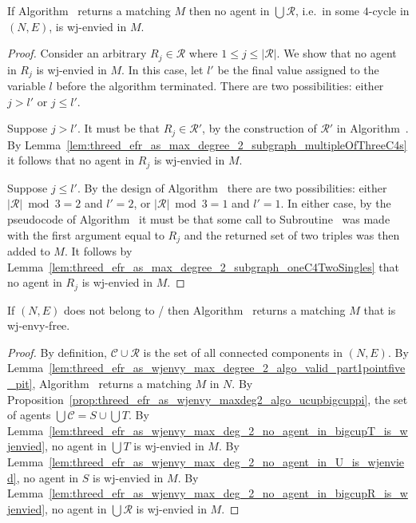 \begin{lem}
\label{lem:threed_efr_as_wjenvy_max_deg_2_no_agent_in_bigcupR_is_wjenvied}
If Algorithm~ returns a matching $M$ then no agent in $\bigcup \mathcal{R}$, i.e.\ in some $4$-cycle in $(N, E)$, is wj-envied in $M$.
\end{lem}
\begin{proof}
Consider an arbitrary $R_j \in \mathcal{R}$ where $1\leq j \leq |\mathcal{R}|$. We show that no agent in $R_j$ is wj-envied in $M$. In this case, let $l'$ be the final value assigned to the variable $l$ before the algorithm terminated. There are two possibilities: either $j>l'$ or $j\leq l'$.

Suppose $j>l'$. It must be that $R_j \in \mathcal{R}'$, by the construction of $\mathcal{R}'$ in Algorithm~. By Lemma~\ref{lem:threed_efr_as_max_degree_2_subgraph_multipleOfThreeC4s} it follows that no agent in $R_j$ is wj-envied in $M$.

Suppose $j\leq l'$. By the design of Algorithm~ there are two possibilities: either $|\mathcal{R}| \bmod 3 = 2$ and $l'=2$, or $|\mathcal{R}| \bmod 3 = 1$ and $l'=1$. In either case, by the pseudocode of Algorithm~ it must be that some call to Subroutine~ was made with the first argument equal to $R_j$ and the returned set of two triples was then added to $M$. It follows by Lemma~\ref{lem:threed_efr_as_max_degree_2_subgraph_oneC4TwoSingles} that no agent in $R_j$ is wj-envied in $M$.
\end{proof}

\begin{lem}
\label{lem:threed_efr_as_wjenvy_max_degree_2_algo_valid_part2_EF}
If $(N, E)$ does not belong to \iwjnomaxdegreetwofamily/ then Algorithm~ returns a matching $M$ that is wj-envy-free.
\end{lem}
\begin{proof}
By definition, $\mathcal{C} \cup \mathcal{R}$ is the set of all connected components in $(N, E)$. By Lemma~\ref{lem:threed_efr_as_wjenvy_max_degree_2_algo_valid_part1pointfive_pit}, Algorithm~ returns a matching $M$ in $N$. By Proposition~\ref{prop:threed_efr_as_wjenvy_maxdeg2_algo_ucupbigcuppi}, the set of agents $\bigcup \mathcal{C} = S \cup \bigcup T$. By Lemma~\ref{lem:threed_efr_as_wjenvy_max_deg_2_no_agent_in_bigcupT_is_wjenvied}, no agent in $\bigcup T$ is wj-envied in $M$. By Lemma~\ref{lem:threed_efr_as_wjenvy_max_deg_2_no_agent_in_U_is_wjenvied}, no agent in $S$ is wj-envied in $M$. By Lemma~\ref{lem:threed_efr_as_wjenvy_max_deg_2_no_agent_in_bigcupR_is_wjenvied}, no agent in $\bigcup \mathcal{R}$ is wj-envied in $M$.
\end{proof}

